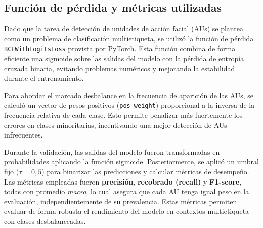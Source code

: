 \documentclass[conference]{IEEEtran}
\begin{document}
\begin{table}[h]
\centering
{}
\caption{Comparación entre HTNet de Kim et al. (2023) y la versión adaptada para clasificación multietiqueta de unidades de acción.}
\label{tab:htnet_vs_adaptado}
\end{table}



\subsection{Función de pérdida y métricas utilizadas}

Dado que la tarea de detección de unidades de acción facial (AUs) se plantea como un problema de clasificación multietiqueta, se utilizó la función de pérdida \texttt{BCEWithLogitsLoss} provista por PyTorch. Esta función combina de forma eficiente una sigmoide sobre las salidas del modelo con la pérdida de entropía cruzada binaria, evitando problemas numéricos y mejorando la estabilidad durante el entrenamiento.

Para abordar el marcado desbalance en la frecuencia de aparición de las AUs, se calculó un vector de pesos positivos (\texttt{pos\_weight}) proporcional a la inversa de la frecuencia relativa de cada clase. Esto permite penalizar más fuertemente los errores en clases minoritarias, incentivando una mejor detección de AUs infrecuentes.

Durante la validación, las salidas del modelo fueron transformadas en probabilidades aplicando la función sigmoide. Posteriormente, se aplicó un umbral fijo ($\tau = 0{,}5$) para binarizar las predicciones y calcular métricas de desempeño. Las métricas empleadas fueron \textbf{precisión}, \textbf{recobrado (recall)} y \textbf{F1-score}, todas con promedio \textit{macro}, lo cual asegura que cada AU tenga igual peso en la evaluación, independientemente de su prevalencia. Estas métricas permiten evaluar de forma robusta el rendimiento del modelo en contextos multietiqueta con clases desbalanceadas.
\end{document}
